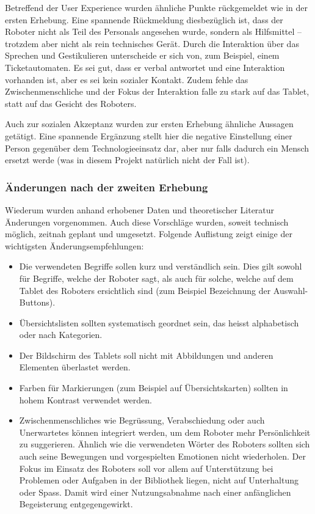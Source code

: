 \documentclass[a4paper,
fontsize=11pt,
oneside,
numbers=noperiodatend,
parskip=half-,
bibliography=totoc,
final
]{scrartcl}
\begin{document}
Betreffend der User Experience wurden ähnliche Punkte rückgemeldet wie
in der ersten Erhebung. Eine spannende Rückmeldung diesbezüglich ist,
dass der Roboter nicht als Teil des Personals angesehen wurde, sondern
als Hilfsmittel -- trotzdem aber nicht als rein technisches Gerät. Durch
die Interaktion über das Sprechen und Gestikulieren unterscheide er sich
von, zum Beispiel, einem Ticketautomaten. Es sei gut, dass er verbal
antwortet und eine Interaktion vorhanden ist, aber es sei kein sozialer
Kontakt. Zudem fehle das Zwischenmenschliche und der Fokus der
Interaktion falle zu stark auf das Tablet, statt auf das Gesicht des
Roboters.

Auch zur sozialen Akzeptanz wurden zur ersten Erhebung ähnliche Aussagen
getätigt. Eine spannende Ergänzung stellt hier die negative Einstellung
einer Person gegenüber dem Technologieeinsatz dar, aber nur falls
dadurch ein Mensch ersetzt werde (was in diesem Projekt natürlich nicht
der Fall ist).

\hypertarget{uxe4nderungen-nach-der-zweiten-erhebung}{%
\subsubsection{Änderungen nach der zweiten Erhebung}\label{uxe4nderungen-nach-der-zweiten-erhebung}}

Wiederum wurden anhand erhobener Daten und theoretischer Literatur
Änderungen vorgenommen. Auch diese Vorschläge wurden, soweit technisch
möglich, zeitnah geplant und umgesetzt. Folgende Auflistung zeigt einige
der wichtigsten Änderungsempfehlungen:

\begin{itemize}
\item
  Die verwendeten Begriffe sollen kurz und verständlich sein. Dies gilt
  sowohl für Begriffe, welche der Roboter sagt, als auch für solche,
  welche auf dem Tablet des Roboters ersichtlich sind (zum Beispiel
  Bezeichnung der Auswahl-Buttons).
\item
  Übersichtslisten sollten systematisch geordnet sein, das heisst
  alphabetisch oder nach Kategorien.
\item
  Der Bildschirm des Tablets soll nicht mit Abbildungen und anderen
  Elementen überlastet werden.
\item
  Farben für Markierungen (zum Beispiel auf Übersichtskarten) sollten in
  hohem Kontrast verwendet werden.
\item
  Zwischenmenschliches wie Begrüssung, Verabschiedung oder auch
  Unerwartetes können integriert werden, um dem Roboter mehr
  Persönlichkeit zu suggerieren. Ähnlich wie die verwendeten Wörter des
  Roboters sollten sich auch seine Bewegungen und vorgespielten
  Emotionen nicht wiederholen. Der Fokus im Einsatz des Roboters soll
  vor allem auf Unterstützung bei Problemen oder Aufgaben in der
  Bibliothek liegen, nicht auf Unterhaltung oder Spass. Damit wird einer
  Nutzungsabnahme nach einer anfänglichen Begeisterung entgegengewirkt.
\end{itemize}
\end{document}

